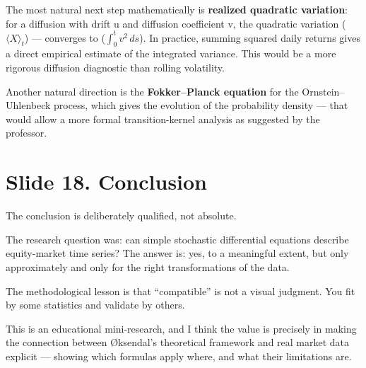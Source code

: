 \documentclass[12pt,a4paper]{article}
\begin{document}
The most natural next step mathematically is
\textbf{realized quadratic variation}:
for a diffusion with drift u and diffusion coefficient v,
the quadratic variation ($\langle X\rangle_t$) ---
converges to ($\int_0^t v^2\,ds$).
In practice, summing squared daily returns gives a direct empirical estimate
of the integrated variance.
This would be a more rigorous diffusion diagnostic than rolling volatility.

Another natural direction is the \textbf{Fokker--Planck equation}
for the Ornstein--Uhlenbeck process,
which gives the evolution of the probability density ---
that would allow a more formal transition-kernel analysis
as suggested by the professor.

\section{Slide 18. Conclusion}

The conclusion is deliberately qualified, not absolute.

The research question was: can simple stochastic differential equations
describe equity-market time series?
The answer is: yes, to a meaningful extent,
but only approximately and only for the right transformations of the data.

The methodological lesson is that ``compatible'' is not a visual judgment.
You fit by some statistics and validate by others.

This is an educational mini-research, and I think the value is precisely in making
the connection between Øksendal's theoretical framework and real market data explicit ---
showing which formulas apply where, and what their limitations are.
\end{document}
